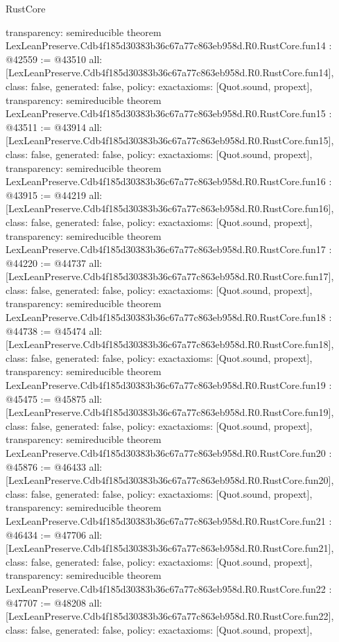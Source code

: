 \begin{lexlean}{RustCore}
\begin{coremodule}
{  transparency: semireducible
}
theorem LexLeanPreserve.Cdb4f185d30383b36c67a77c863eb958d.R0.RustCore.fun14 : @42559 := @43510 {
  all: [LexLeanPreserve.Cdb4f185d30383b36c67a77c863eb958d.R0.RustCore.fun14],
  class: false,
  generated: false,
  policy: exact{axioms: [Quot.sound, propext]},
  transparency: semireducible
}
theorem LexLeanPreserve.Cdb4f185d30383b36c67a77c863eb958d.R0.RustCore.fun15 : @43511 := @43914 {
  all: [LexLeanPreserve.Cdb4f185d30383b36c67a77c863eb958d.R0.RustCore.fun15],
  class: false,
  generated: false,
  policy: exact{axioms: [Quot.sound, propext]},
  transparency: semireducible
}
theorem LexLeanPreserve.Cdb4f185d30383b36c67a77c863eb958d.R0.RustCore.fun16 : @43915 := @44219 {
  all: [LexLeanPreserve.Cdb4f185d30383b36c67a77c863eb958d.R0.RustCore.fun16],
  class: false,
  generated: false,
  policy: exact{axioms: [Quot.sound, propext]},
  transparency: semireducible
}
theorem LexLeanPreserve.Cdb4f185d30383b36c67a77c863eb958d.R0.RustCore.fun17 : @44220 := @44737 {
  all: [LexLeanPreserve.Cdb4f185d30383b36c67a77c863eb958d.R0.RustCore.fun17],
  class: false,
  generated: false,
  policy: exact{axioms: [Quot.sound, propext]},
  transparency: semireducible
}
theorem LexLeanPreserve.Cdb4f185d30383b36c67a77c863eb958d.R0.RustCore.fun18 : @44738 := @45474 {
  all: [LexLeanPreserve.Cdb4f185d30383b36c67a77c863eb958d.R0.RustCore.fun18],
  class: false,
  generated: false,
  policy: exact{axioms: [Quot.sound, propext]},
  transparency: semireducible
}
theorem LexLeanPreserve.Cdb4f185d30383b36c67a77c863eb958d.R0.RustCore.fun19 : @45475 := @45875 {
  all: [LexLeanPreserve.Cdb4f185d30383b36c67a77c863eb958d.R0.RustCore.fun19],
  class: false,
  generated: false,
  policy: exact{axioms: [Quot.sound, propext]},
  transparency: semireducible
}
theorem LexLeanPreserve.Cdb4f185d30383b36c67a77c863eb958d.R0.RustCore.fun20 : @45876 := @46433 {
  all: [LexLeanPreserve.Cdb4f185d30383b36c67a77c863eb958d.R0.RustCore.fun20],
  class: false,
  generated: false,
  policy: exact{axioms: [Quot.sound, propext]},
  transparency: semireducible
}
theorem LexLeanPreserve.Cdb4f185d30383b36c67a77c863eb958d.R0.RustCore.fun21 : @46434 := @47706 {
  all: [LexLeanPreserve.Cdb4f185d30383b36c67a77c863eb958d.R0.RustCore.fun21],
  class: false,
  generated: false,
  policy: exact{axioms: [Quot.sound, propext]},
  transparency: semireducible
}
theorem LexLeanPreserve.Cdb4f185d30383b36c67a77c863eb958d.R0.RustCore.fun22 : @47707 := @48208 {
  all: [LexLeanPreserve.Cdb4f185d30383b36c67a77c863eb958d.R0.RustCore.fun22],
  class: false,
  generated: false,
  policy: exact{axioms: [Quot.sound, propext]},
}
\end{coremodule}
\end{lexlean}
